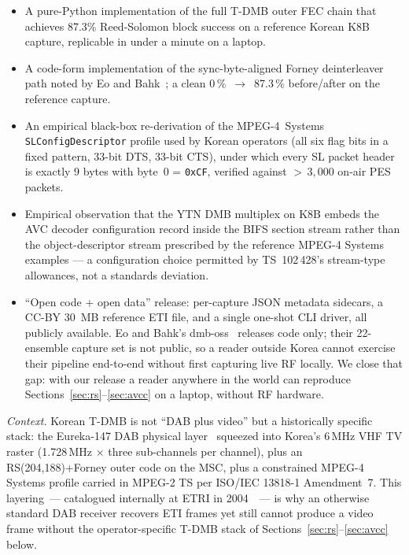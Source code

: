 \documentclass[conference,letterpaper,10pt]{IEEEtran}
\begin{document}
\begin{itemize}
\item A pure-Python implementation of the full T-DMB outer FEC
      chain that achieves 87.3\% Reed-Solomon block success on a
      reference Korean K8B capture, replicable in under a minute
      on a laptop.
\item A code-form implementation of the sync-byte-aligned
      Forney deinterleaver path noted by Eo and
      Bahk~\cite{eo2024tdmb}; a clean
      0\,\%~$\to$~87.3\,\% before/after on the reference capture.
\item An empirical black-box re-derivation of the
      MPEG-4~Systems \texttt{SLConfigDescriptor} profile used by
      Korean operators (all six flag bits in a fixed pattern,
      33-bit DTS, 33-bit CTS), under which every SL packet
      header is exactly 9 bytes with byte~0 = \texttt{0xCF},
      verified against \(>\,3{,}000\) on-air PES packets.
\item Empirical observation that the YTN DMB multiplex on K8B
      embeds the AVC decoder configuration record inside the
      BIFS section stream rather than the object-descriptor
      stream prescribed by the reference MPEG-4 Systems examples
      --- a configuration choice permitted by TS~102\,428's
      stream-type allowances, not a standards deviation.
\item ``Open code + open data'' release: per-capture JSON
      metadata sidecars, a CC-BY 30~MB reference ETI file, and a
      single one-shot CLI driver, all publicly available.  Eo and
      Bahk's dmb-oss~\cite{eo2024tdmb} releases code only; their
      22-ensemble capture set is not public, so a reader outside
      Korea cannot exercise their pipeline end-to-end without
      first capturing live RF locally.  We close that gap: with
      our release a reader anywhere in the world can reproduce
      Sections~\ref{sec:rs}--\ref{sec:avcc} on a laptop, without
      RF hardware.
\end{itemize}

\emph{Context.}  Korean T-DMB is not ``DAB plus video'' but a
historically specific stack: the Eureka-147 DAB physical
layer~\cite{etsi300401} squeezed into Korea's 6\,MHz VHF TV
raster (1.728\,MHz $\times$ three sub-channels per channel),
plus an RS(204,188)+Forney outer code on the MSC, plus a
constrained MPEG-4 Systems profile carried in MPEG-2 TS per
ISO/IEC 13818-1 Amendment~7.  This layering~--- catalogued
internally at ETRI in 2004~\cite{lee2004m4smux}~--- is why an
otherwise standard DAB receiver recovers ETI frames yet still
cannot produce a video frame without the operator-specific
T-DMB stack of Sections~\ref{sec:rs}--\ref{sec:avcc} below.
\end{document}

